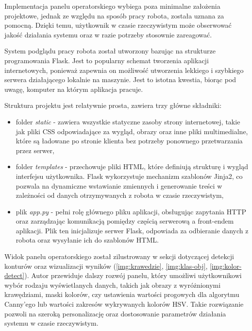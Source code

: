 Implementacja panelu operatorskiego wybiega poza minimalne założenia projektowe, jednak ze względu na sposób pracy robota, została uznana za pomocną. Dzięki temu, użytkownik w czasie rzeczywistym może obserwować jakość działania systemu oraz w razie potrzeby stosownie zareagować. 

System podglądu pracy robota został utworzony bazując na strukturze programowania Flask. Jest to popularny schemat tworzenia aplikacji internetowych, ponieważ zapewnia on możliwość utworzenia lekkiego i szybkiego serwera działającego lokalnie na maszynie. Jest to istotna kwestia, biorąc pod uwagę, komputer na którym aplikacja pracuje. 

Struktura projektu jest relatywnie prosta, zawiera trzy główne składniki:
\begin{itemize}
  \item folder \textit{static} - zawiera wszystkie statyczne zasoby strony internetowej, takie jak pliki CSS odpowiadające za wygląd, obrazy oraz inne pliki multimedialne, które są ładowane po stronie klienta bez potrzeby ponownego przetwarzania przez serwer,
  \item folder \textit{templates} - przechowuje pliki HTML, które definiują strukturę i wygląd interfejsu użytkownika. Flask wykorzystuje mechanizm szablonów Jinja2, co pozwala na dynamiczne wstawianie zmiennych i generowanie treści w zależności od danych otrzymywanych z robota w czasie rzeczywistym,
  \item plik \textit{app.py} -  pełni rolę głównego pliku aplikacji, obsługując zapytania HTTP oraz zarządzając komunikacją pomiędzy częścią serwerową a front-endem aplikacji. Plik ten inicjalizuje serwer Flask, odpowiada za odbieranie danych z robota oraz wysyłanie ich do szablonów HTML.
\end{itemize} 


Widok panelu operatorskiego został zilustrowany w sekcji dotyczącej detekcji konturów oraz wizualizacji wyników (\ref{img:krawedzie}, \ref{img:klas-obj}, \ref{img:kolor-detect}). Autor przewiduje dalszy rozwój panelu, który umożliwi użytkownikowi wybór rodzaju wyświetlanych danych, takich jak obrazy z wyróżnionymi krawędziami, maski kolorów, czy ustawienia wartości progowych dla algorytmu Canny’ego lub wartości zakresów wykrywanych kolorów HSV. Takie rozwiązanie pozwoli na szeroką personalizację oraz dostosowanie parametrów działania systemu w czasie rzeczywistym.





